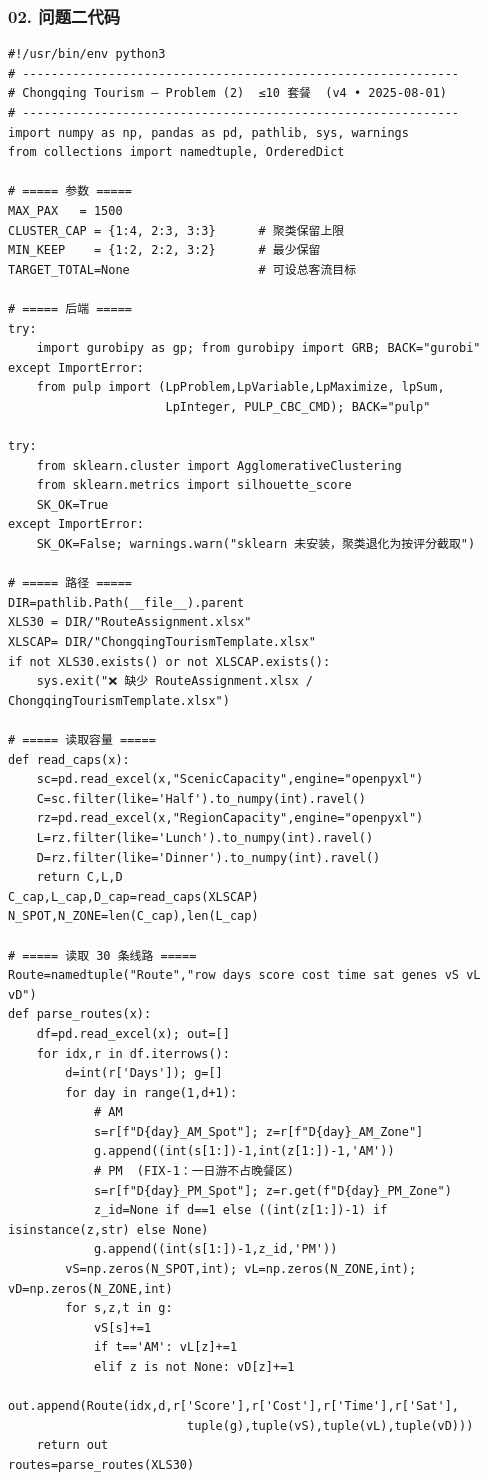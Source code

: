 \documentclass[12pt,a4paper]{article}
\begin{document}
\subsubsection*{02. 问题二代码}
\begin{lstlisting}
#!/usr/bin/env python3
# -------------------------------------------------------------
# Chongqing Tourism – Problem (2)  ≤10 套餐  (v4 • 2025‑08‑01)
# -------------------------------------------------------------
import numpy as np, pandas as pd, pathlib, sys, warnings
from collections import namedtuple, OrderedDict

# ===== 参数 =====
MAX_PAX   = 1500
CLUSTER_CAP = {1:4, 2:3, 3:3}      # 聚类保留上限
MIN_KEEP    = {1:2, 2:2, 3:2}      # 最少保留
TARGET_TOTAL=None                  # 可设总客流目标

# ===== 后端 =====
try:
    import gurobipy as gp; from gurobipy import GRB; BACK="gurobi"
except ImportError:
    from pulp import (LpProblem,LpVariable,LpMaximize, lpSum,
                      LpInteger, PULP_CBC_CMD); BACK="pulp"

try:
    from sklearn.cluster import AgglomerativeClustering
    from sklearn.metrics import silhouette_score
    SK_OK=True
except ImportError:
    SK_OK=False; warnings.warn("sklearn 未安装，聚类退化为按评分截取")

# ===== 路径 =====
DIR=pathlib.Path(__file__).parent
XLS30 = DIR/"RouteAssignment.xlsx"
XLSCAP= DIR/"ChongqingTourismTemplate.xlsx"
if not XLS30.exists() or not XLSCAP.exists():
    sys.exit("❌ 缺少 RouteAssignment.xlsx / ChongqingTourismTemplate.xlsx")

# ===== 读取容量 =====
def read_caps(x):
    sc=pd.read_excel(x,"ScenicCapacity",engine="openpyxl")
    C=sc.filter(like='Half').to_numpy(int).ravel()
    rz=pd.read_excel(x,"RegionCapacity",engine="openpyxl")
    L=rz.filter(like='Lunch').to_numpy(int).ravel()
    D=rz.filter(like='Dinner').to_numpy(int).ravel()
    return C,L,D
C_cap,L_cap,D_cap=read_caps(XLSCAP)
N_SPOT,N_ZONE=len(C_cap),len(L_cap)

# ===== 读取 30 条线路 =====
Route=namedtuple("Route","row days score cost time sat genes vS vL vD")
def parse_routes(x):
    df=pd.read_excel(x); out=[]
    for idx,r in df.iterrows():
        d=int(r['Days']); g=[]
        for day in range(1,d+1):
            # AM
            s=r[f"D{day}_AM_Spot"]; z=r[f"D{day}_AM_Zone"]
            g.append((int(s[1:])-1,int(z[1:])-1,'AM'))
            # PM  (FIX‑1：一日游不占晚餐区)
            s=r[f"D{day}_PM_Spot"]; z=r.get(f"D{day}_PM_Zone")
            z_id=None if d==1 else ((int(z[1:])-1) if isinstance(z,str) else None)
            g.append((int(s[1:])-1,z_id,'PM'))
        vS=np.zeros(N_SPOT,int); vL=np.zeros(N_ZONE,int); vD=np.zeros(N_ZONE,int)
        for s,z,t in g:
            vS[s]+=1
            if t=='AM': vL[z]+=1
            elif z is not None: vD[z]+=1
        out.append(Route(idx,d,r['Score'],r['Cost'],r['Time'],r['Sat'],
                         tuple(g),tuple(vS),tuple(vL),tuple(vD)))
    return out
routes=parse_routes(XLS30)


\end{lstlisting}
\end{document}

